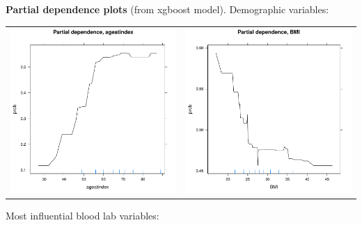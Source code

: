 \documentclass[12pt]{article}
\begin{document}
\textbf{Partial dependence plots} (from xgboost model).
Demographic variables:
\begin{center}
\begin{tabular}{cc}
\includegraphics[width=.4\textwidth]{pdp_age.pdf} &
\includegraphics[width=.4\textwidth]{pdp_bmi.pdf} \\
\end{tabular}
\end{center}
Most influential blood lab variables:
\end{document}
